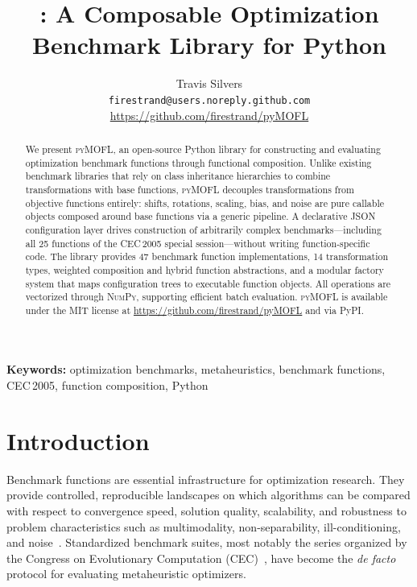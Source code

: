 \documentclass[11pt,a4paper]{article}
\title{\pymofl{}: A Composable Optimization Benchmark Library for Python}
\author{
  Travis Silvers\\
  \texttt{firestrand@users.noreply.github.com}\\
  \url{https://github.com/firestrand/pyMOFL}
}
\date{}
\newcommand{\pymofl}{\textsc{pyMOFL}}
\newcommand{\numpy}{\textsc{NumPy}}
\begin{document}
\maketitle

\begin{abstract}
We present \pymofl{}, an open-source Python library for constructing and
evaluating optimization benchmark functions through functional composition.
Unlike existing benchmark libraries that rely on class inheritance hierarchies
to combine transformations with base functions, \pymofl{} decouples
transformations from objective functions entirely: shifts, rotations, scaling,
bias, and noise are pure callable objects composed around base functions via a
generic pipeline. A declarative JSON configuration layer drives construction of
arbitrarily complex benchmarks---including all 25 functions of the CEC\,2005
special session---without writing function-specific code. The library provides
47 benchmark function implementations, 14 transformation types, weighted
composition and hybrid function abstractions, and a modular factory system that
maps configuration trees to executable function objects. All operations are
vectorized through \numpy{}, supporting efficient batch evaluation. \pymofl{}
is available under the MIT license at
\url{https://github.com/firestrand/pyMOFL} and via PyPI.
\end{abstract}

\noindent\textbf{Keywords:} optimization benchmarks, metaheuristics, benchmark functions,
CEC\,2005, function composition, Python

\section{Introduction}\label{sec:intro}

Benchmark functions are essential infrastructure for optimization research.
They provide controlled, reproducible landscapes on which algorithms can be
compared with respect to convergence speed, solution quality, scalability, and
robustness to problem characteristics such as multimodality, non-separability,
ill-conditioning, and noise~\citep{Jamil2013}. Standardized benchmark suites,
most notably the series organized by the Congress on Evolutionary Computation
(CEC)~\citep{Suganthan2005}, have become the \emph{de facto} protocol for
evaluating metaheuristic optimizers.
\end{document}

